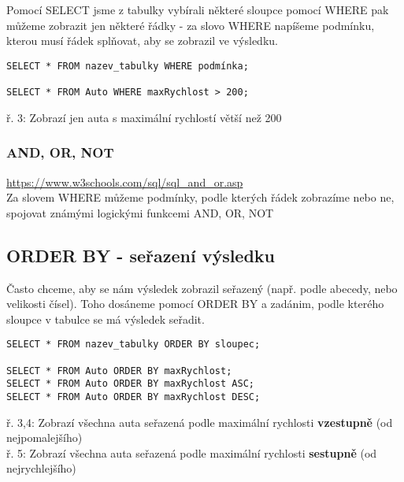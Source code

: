 Pomocí SELECT jsme z tabulky vybírali některé sloupce pomocí WHERE pak můžeme zobrazit jen některé řádky - za slovo WHERE napíšeme podmínku, kterou musí řádek splňovat, aby se zobrazil ve výsledku.\\
\begin{minipage}[t]{.45\textwidth}
\begin{code}
\begin{verbatim}
SELECT * FROM nazev_tabulky WHERE podmínka;

SELECT * FROM Auto WHERE maxRychlost > 200;
\end{verbatim}
\label{code:where}
\end{code}
\end{minipage}
\begin{minipage}[t]{.45\textwidth}
\vspace{1.7cm}
ř. 3:	Zobrazí jen auta s maximální rychlostí větší než 200
\end{minipage}

\subsubsection{AND, OR, NOT}
\url{https://www.w3schools.com/sql/sql_and_or.asp}\\
Za slovem WHERE můžeme podmínky, podle kterých řádek zobrazíme nebo ne, spojovat známými logickými funkcemi AND, OR, NOT

\subsection{ORDER BY - seřazení výsledku}

Často chceme, aby se nám výsledek zobrazil seřazený (např. podle abecedy, nebo velikosti čísel). Toho dosáneme pomocí ORDER BY a zadánim, podle kterého sloupce v tabulce se má výsledek seřadit.
\begin{minipage}[t]{.45\textwidth}
\begin{code}
\begin{verbatim}
SELECT * FROM nazev_tabulky ORDER BY sloupec;

SELECT * FROM Auto ORDER BY maxRychlost;
SELECT * FROM Auto ORDER BY maxRychlost ASC;
SELECT * FROM Auto ORDER BY maxRychlost DESC;
\end{verbatim}
\label{code:order_by}
\end{code}
\end{minipage}
\begin{minipage}[t]{.45\textwidth}
\vspace{2cm}
ř. 3,4: Zobrazí všechna auta seřazená podle maximální rychlosti \textbf{vzestupně} (od nejpomalejšího)\\
ř. 5:	Zobrazí všechna auta seřazená podle maximální rychlosti \textbf{sestupně} (od nejrychlejšího)
\end{minipage}

